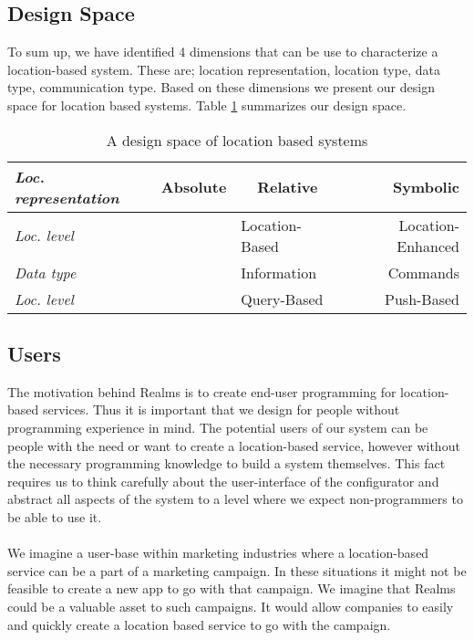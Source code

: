 \subsection{Design Space} %
\label{sub:design_space}
To sum up, we have identified 4 dimensions that can be use to characterize a location-based system. These are; location representation, location type, data type, communication type. Based on these dimensions we present our design space for location based systems. Table \ref{tab:designspace} summarizes our design space.
\begin{table}
\begin{tabular}{|l|l|c|r|}
  \hline
  \emph{Loc. representation} & Absolute & Relative & Symbolic \\ \hline
  \emph{Loc. level} & \multicolumn{1}{l}{} & \multicolumn{1}{l|}{Location-Based} & \multicolumn{1}{r|}{Location-Enhanced} \\ \hline
  \emph{Data type} & \multicolumn{1}{l}{} & \multicolumn{1}{l|}{Information} & \multicolumn{1}{r|}{Commands} \\ \hline
  \emph{Loc. level} & \multicolumn{1}{l}{} & \multicolumn{1}{l|}{Query-Based} & \multicolumn{1}{r|}{Push-Based} \\
  \hline
\end{tabular}
	\caption{A design space of location based systems}
  \label{tab:designspace}
\end{table}


\subsection{Users} %
\label{sub:users}
The motivation behind Realms is to create end-user programming for location-based services. Thus it is important that we design for people without programming experience in mind. The potential users of our system can be people with the need or want to create a location-based service, however without the necessary programming knowledge to build a system themselves. This fact requires us to think carefully about the user-interface of the configurator and abstract all aspects of the system to a level where we expect non-programmers to be able to use it. 
\\\\
We imagine a user-base within marketing industries where a location-based service can be a part of a marketing campaign. In these situations it might not be feasible to create a new app to go with that campaign. We imagine that Realms could be a valuable asset to such campaigns. It would allow companies to easily and quickly create a location based service to go with the campaign. 


